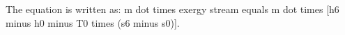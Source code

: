 The equation is written as:  
m dot times exergy stream equals m dot times [h6 minus h0 minus T0 times (s6 minus s0)].